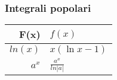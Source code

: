 \subsubsection{Integrali popolari}
\begin{center}
\begin{tabular}{r | l}
	F(x) & $f(x)$ \\ [1ex]
	\hline
	$ln(x)$	& $x(\ln x -1)$ \\ [0.5ex]
	$a^x$	& $\frac{a^x}{ln|a|}$ \\ [0.5ex]
\end{tabular}
\end{center}
